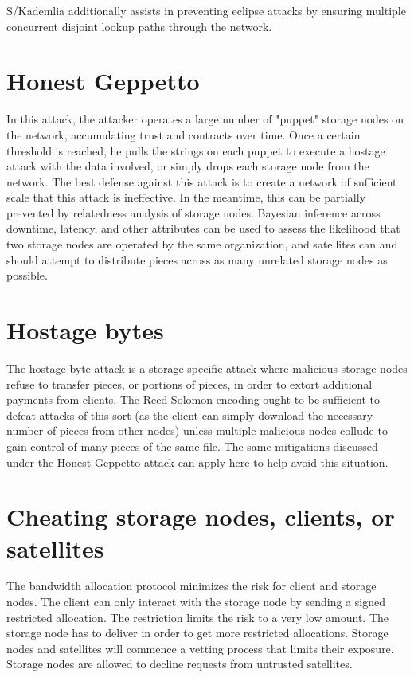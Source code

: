 \documentclass[11pt,fleqn,openany]{book}
\begin{document}
S/Kademlia additionally assists in preventing eclipse attacks by ensuring
multiple concurrent disjoint lookup paths through the network.

\section{Honest Geppetto}

In this attack,
the attacker operates a large number of "puppet" storage nodes on the network,
accumulating trust and contracts over time. Once a certain threshold is reached,
he pulls the strings on each puppet to execute a hostage attack with the data
involved, or simply drops each storage node from the network. The best defense
against this attack is to create a network of sufficient scale that this attack
is ineffective. In the meantime, this can be partially prevented by relatedness
analysis of storage nodes. Bayesian inference across downtime, latency, and other
attributes can be used to assess the likelihood that two storage nodes are
operated by the same organization, and satellites can and should attempt to
distribute pieces across as many unrelated storage nodes as possible.

\section{Hostage bytes}

The hostage byte attack is a storage-specific attack where malicious storage
nodes
refuse to transfer pieces, or portions of pieces, in order to extort additional
payments from clients. The Reed-Solomon encoding ought to be sufficient to
defeat attacks of this sort (as the client can simply download the necessary
number of pieces from other nodes) unless multiple malicious nodes collude to
gain control of many pieces of the same file. The same mitigations discussed
under the Honest Geppetto attack can apply here to help avoid this situation.

\section{Cheating storage nodes, clients, or satellites}

The bandwidth allocation protocol minimizes the risk for client and storage
nodes.
The client can only interact with the storage node by sending a signed
restricted allocation.
The restriction limits the risk to a very low amount.
The storage node has to deliver in order to get more restricted allocations.
Storage nodes and satellites will commence a vetting process that limits their
exposure.
Storage nodes are allowed to decline requests from untrusted satellites.
\end{document}
